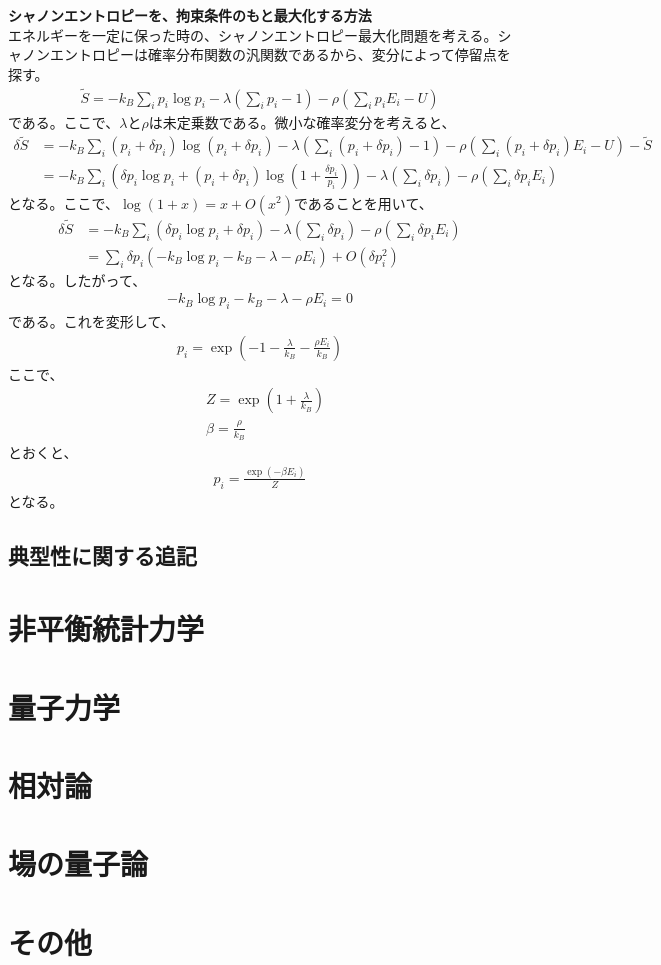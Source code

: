 \documentclass[a4paper,11pt]{jsarticle}
\numberwithin{equation}{section}
\begin{document}
\textbf{シャノンエントロピーを、拘束条件のもと最大化する方法}\\
エネルギーを一定に保った時の、シャノンエントロピー最大化問題を考える。シャノンエントロピーは確率分布関数の汎関数であるから、変分によって停留点を探す。
\begin{align}
  \tilde{S}= -k_B\sum_{i}p_i\log p_i -\lambda\left(\sum_{i}p_i - 1\right)-\rho\left(\sum_{i}p_iE_i - U\right)  
\end{align}
である。ここで、$\lambda$と$\rho$は未定乗数である。微小な確率変分を考えると、
\begin{align}
  \delta \tilde{S} &= -k_B\sum_{i}(p_i + \delta p_i)\log (p_i + \delta p_i) -\lambda\left(\sum_{i}(p_i + \delta p_i)- 1\right) -\rho\left(\sum_{i}(p_i + \delta p_i)E_i - U\right)-\tilde{S}\\
  &= -k_B\sum_{i}\left(\delta p_i\log p_i + (p_i + \delta p_i)\log \left(1 + \frac{\delta p_i}{p_i}\right)\right)  -\lambda\left(\sum_{i}\delta p_i\right)-\rho\left(\sum_{i}\delta p_iE_i\right)
\end{align}
となる。ここで、$\log(1+x) = x + O(x^2)$であることを用いて、
\begin{align}
  \delta \tilde{S} &= -k_B\sum_{i}\left(\delta p_i\log p_i + \delta p_i\right)  -\lambda\left(\sum_{i}\delta p_i\right)-\rho\left(\sum_{i}\delta p_iE_i\right)\\
  &= \sum_{i}\delta p_i\left(-k_B\log p_i - k_B - \lambda - \rho E_i\right) + O(\delta p_i^2)
\end{align}
となる。したがって、
\begin{align}
  -k_B\log p_i - k_B - \lambda - \rho E_i = 0
\end{align}
である。これを変形して、
\begin{align}
  p_i = \exp(-1-\frac{\lambda}{k_B}-\frac{\rho E_i}{k_B})
\end{align}
ここで、
\begin{align}
  &Z = \exp(1 + \frac{\lambda}{k_B})\\
  &\beta = \frac{\rho}{k_B}
\end{align}
とおくと、
\begin{align}
  p_i = \frac{\exp(-\beta E_i)}{Z}
\end{align}
となる。

\subsection{典型性に関する追記}


\section{非平衡統計力学}

\section{量子力学}

\section{相対論}

\section{場の量子論}

\section{その他}
\end{document}
